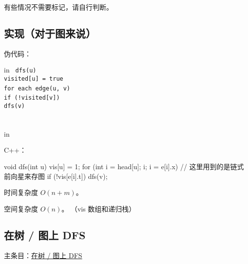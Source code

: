 有些情况不需要标记，请自行判断。

\subsection{实现（对于图来说）}

伪代码：

 in
\texttt{
dfs(u) {\\  visited[u] = true\\  for each edge(u, v) {\\    if (!visited[v]) {\\      dfs(v)\\    }\\  }\\}}
 in

C++：

\begin{cppcode}
void dfs(int u) {
  vis[u] = 1;
  for (int i = head[u]; i; i = e[i].x) {
    // 这里用到的是链式前向星来存图
    if (!vis[e[i].t]) {
      dfs(v);
    }
  }
}
\end{cppcode}

时间复杂度 $O(n + m)$。

空间复杂度 $O(n)$。 （vis 数组和递归栈）

\subsection{在树 / 图上 DFS}

主条目：\href{/graph/traverse}{在树 / 图上 DFS}
